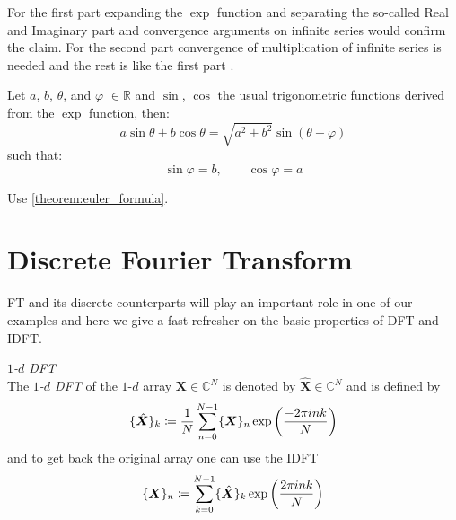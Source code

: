 	\begin{Proof}
		For the first part expanding the $\exp$ function and separating the so-called Real and Imaginary part and convergence arguments 
	on infinite series would confirm the claim\cite{Rudin1976}\cite{Rudin1987}\cite{Stein2005}\cite{Stein2003}. For the second part 
	convergence of multiplication of infinite series is needed and the rest is like the first part \cite{Rudin1976}\cite{Rudin1987}\cite{Stein2005}\cite{Stein2003}. 
	\end{Proof}
	\begin{Cor}
		Let $a$, $b$, $\theta$, and $\varphi$ $\in \mathbb{R}$ and $\sin$, $\cos$ the usual trigonometric functions derived from the $\exp$ function, then:
		\begin{equation*}
			a\sin \theta+b\cos \theta  = \sqrt{a^2+b^2}\sin(\theta + \varphi)
		\end{equation*}
		such that:
		\begin{equation*}
			\sin\varphi=b, \qquad \cos\varphi = a
		\end{equation*}
		\end{Cor}
	\begin{Proof}
		Use \cref{theorem:euler_formula}.
	\end{Proof}


\section{Discrete Fourier Transform}
\ac{FT} and its discrete counterparts will play an important role in one of our examples and here we give a fast refresher on the basic properties of \ac{DFT} and \ac{IDFT}.

\begin{Def}\label{def:1ddft}
    \emph{$1$-$d$ \ac{DFT}}\\
    The \emph{$1$-$d$ \ac{DFT}} of the $1$-$d$ array $\boldsymbol{X} \in \mathbb{C}^{N}$ is denoted by 
    $\hat {\boldsymbol{X}} \in \mathbb{C}^{N}$ and is defined by
    \begin{equation}\label{eq:1ddft}
        \{\hat {\boldsymbol{X}}\}_{k} \coloneqq \frac{1}{N}\sum_{n=0}^{N-1} \{{\boldsymbol{X}}\}_{n}\exp\left({\frac{-2\pi ink}{N}}\right)\index{\ac{FT}!$1$-$d$ \ac{DFT}}
    \end{equation}
    and to get back the original array one can use the \ac{IDFT} 
    \begin{equation}\label{eq:1didft}
        \{{\boldsymbol{X}}\}_{n} \coloneqq \sum_{k=0}^{N-1}\{\hat {\boldsymbol{X}}\}_{k}\exp\left({\frac{2\pi ink}{N}}\right)\index{\ac{FT}!$1$-$d$ \ac{IDFT}}
    \end{equation}    
\end{Def}

